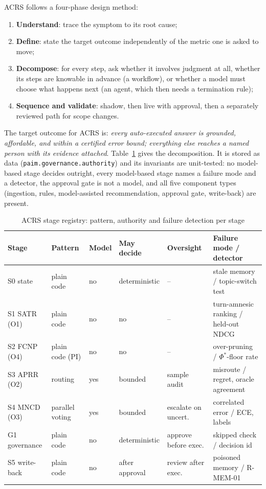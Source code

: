 ACRS follows a four-phase design method:
\begin{enumerate}
  \item \textbf{Understand}: trace the symptom to its root cause;
  \item \textbf{Define}: state the target outcome independently of the metric one is asked to move;
  \item \textbf{Decompose}: for every step, ask whether it involves judgment at all, whether its steps
        are knowable in advance (a workflow), or whether a model must choose what happens next (an
        agent, which then needs a termination rule);
  \item \textbf{Sequence and validate}: shadow, then live with approval, then a separately reviewed path for
        scope changes.
\end{enumerate}
The target outcome for ACRS is:
\emph{every auto-executed answer is grounded, affordable, and within a certified error bound;
everything else reaches a named person with its evidence attached}.
Table~\ref{tab:gov-stages} gives the decomposition. It is stored as data
(\texttt{paim.governance.authority}) and its invariants are unit-tested: no model-based stage decides
outright, every model-based stage names a failure mode and a detector, the approval gate is not a
model, and all five component types (ingestion, rules, model-assisted recommendation, approval gate,
write-back) are present.

\begin{table}[htbp]
  \centering
  \caption{ACRS stage registry: pattern, authority and failure detection per stage}
  \label{tab:gov-stages}
  \scriptsize\setlength{\tabcolsep}{2.5pt}
  \begin{tabular}{@{}llllll@{}}
    \toprule
    Stage & Pattern & Model & May decide & Oversight & Failure mode / detector \\
    \midrule
    S0 state & plain code & no & deterministic & -- & stale memory / topic-switch test \\
    S1 SATR (O1) & plain code & no & no & -- & turn-amnesic ranking / held-out NDCG \\
    S2 FCNP (O4) & plain code (PI) & no & no & -- & over-pruning / $\Phi^\ast$-floor rate \\
    S3 APRR (O2) & routing & yes & bounded & sample audit & misroute / regret, oracle agreement \\
    S4 MNCD (O3) & parallel voting & yes & bounded & escalate on uncert. & correlated error / ECE, labels \\
    G1 governance & plain code & no & deterministic & approve before exec. & skipped check / decision id \\
    S5 write-back & plain code & no & after approval & review after exec. & poisoned memory / R-MEM-01 \\
    \bottomrule
  \end{tabular}
\end{table}

